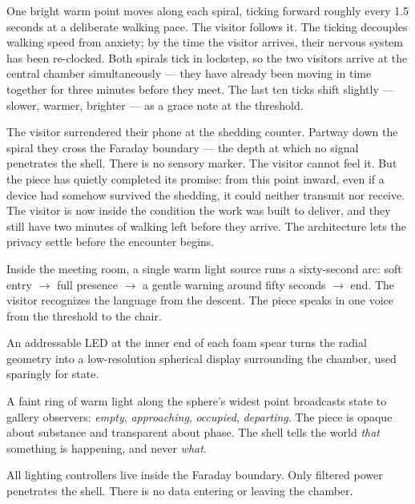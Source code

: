 \documentclass[10pt, letterpaper]{article}
\begin{document}
\begin{description}[style=nextline, leftmargin=0.6em, itemsep=0.5em]
  \item[Spiral spot guide.] One bright warm point moves along each spiral, ticking forward roughly every 1.5 seconds at a deliberate walking pace. The visitor follows it. The ticking decouples walking speed from anxiety; by the time the visitor arrives, their nervous system has been re-clocked. Both spirals tick in lockstep, so the two visitors arrive at the central chamber simultaneously --- they have already been moving in time together for three minutes before they meet. The last ten ticks shift slightly --- slower, warmer, brighter --- as a grace note at the threshold.
  \item[Crossing the boundary.] The visitor surrendered their phone at the shedding counter. Partway down the spiral they cross the Faraday boundary --- the depth at which no signal penetrates the shell. There is no sensory marker. The visitor cannot feel it. But the piece has quietly completed its promise: from this point inward, even if a device had somehow survived the shedding, it could neither transmit nor receive. The visitor is now inside the condition the work was built to deliver, and they still have two minutes of walking left before they arrive. The architecture lets the privacy settle before the encounter begins.
  \item[The chamber light.] Inside the meeting room, a single warm light source runs a sixty-second arc: soft entry $\rightarrow$ full presence $\rightarrow$ a gentle warning around fifty seconds $\rightarrow$ end. The visitor recognizes the language from the descent. The piece speaks in one voice from the threshold to the chair.
  \item[Spear-tip pixels.] An addressable LED at the inner end of each foam spear turns the radial geometry into a low-resolution spherical display surrounding the chamber, used sparingly for state.
  \item[The exterior shell.] A faint ring of warm light along the sphere's widest point broadcasts state to gallery observers: \textit{empty}, \textit{approaching}, \textit{occupied}, \textit{departing}. The piece is opaque about substance and transparent about phase. The shell tells the world \textit{that} something is happening, and never \textit{what}.
\end{description}

All lighting controllers live inside the Faraday boundary. Only filtered power penetrates the shell. There is no data entering or leaving the chamber.
\end{document}

